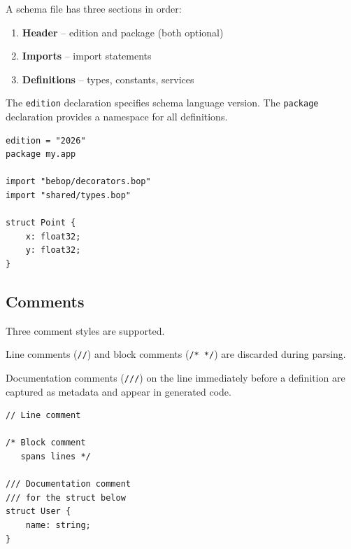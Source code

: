 \documentclass[10pt,onecolumn]{article}
\begin{document}
\begin{minipage}{\textwidth}
\begin{minipage}[t]{0.52\textwidth}
A schema file has three sections in order:

\begin{enumerate}[leftmargin=1.5em,itemsep=2pt,topsep=4pt]
\item \textbf{Header} -- edition and package (both optional)
\item \textbf{Imports} -- import statements
\item \textbf{Definitions} -- types, constants, services
\end{enumerate}

The \texttt{edition} declaration specifies schema language version. The \texttt{package} declaration provides a namespace for all definitions.
\end{minipage}\hfill
\begin{minipage}[t]{0.44\textwidth}
\begin{lstlisting}[language=bebop,aboveskip=0pt,belowskip=0pt]
edition = "2026"
package my.app

import "bebop/decorators.bop"
import "shared/types.bop"

struct Point {
    x: float32;
    y: float32;
}
\end{lstlisting}
\end{minipage}
\end{minipage}

\subsection{Comments}

\begin{minipage}{\textwidth}
\begin{minipage}[t]{0.52\textwidth}
Three comment styles are supported.

Line comments (\texttt{//}) and block comments (\texttt{/* */}) are discarded during parsing.

\raggedright
Documentation comments (\texttt{///}) on the line immediately before a definition are captured as metadata and appear in generated code.
\end{minipage}\hfill
\begin{minipage}[t]{0.44\textwidth}
\begin{lstlisting}[language=bebop,aboveskip=0pt,belowskip=0pt]
// Line comment

/* Block comment
   spans lines */

/// Documentation comment
/// for the struct below
struct User {
    name: string;
}
\end{lstlisting}
\end{minipage}
\end{minipage}
\end{document}
